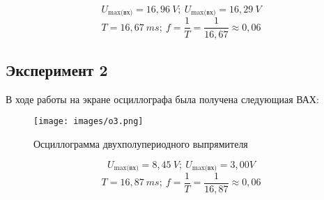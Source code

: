 \documentclass[12pt]{article}
\begin{document}
    $$ U_{\text{max(вх)}} = 16,96\ V;\ U_{\text{max(вх)}} =  16,29\ V $$
    $$ T = 16,67\ ms;\ f = \frac{1}{T} = \frac{1}{16,67} \approx 0,06 $$

    \newpage

    \subsection*{Эксперимент 2}

    В ходе работы на экране осциллографа была получена следующиая ВАХ:

    \begin{figure}[ht]
        \centering
        \texttt{[image: images/o3.png]}
        \caption{Осциллограмма двухполупериодного выпрямителя}
        \label{fig:o:3}
    \end{figure}

    $$ U_{\text{max(вх)}} = 8,45\ V;\ U_{\text{max(вх)}} =  3,00 V $$
    $$ T = 16,87\ ms;\ f = \frac{1}{T} = \frac{1}{16,87} \approx 0,06 $$

    \newpage
\end{document}
